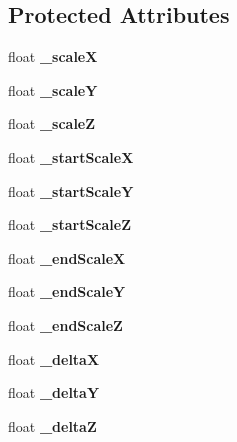 \subsection*{Protected Attributes}
\begin{DoxyCompactItemize}
\item 
\mbox{\label{classScaleTo_a9975e1bbe1566f02b118ff34f94ba5c6}} 
float {\bfseries \+\_\+scaleX}
\item 
\mbox{\label{classScaleTo_a14cf56324b48570a26e6d3262ee48d97}} 
float {\bfseries \+\_\+scaleY}
\item 
\mbox{\label{classScaleTo_af1853d4634f1783ca1b4d7de4adb78c1}} 
float {\bfseries \+\_\+scaleZ}
\item 
\mbox{\label{classScaleTo_a5e89593a799a7f4d03d2557bb407f7d9}} 
float {\bfseries \+\_\+start\+ScaleX}
\item 
\mbox{\label{classScaleTo_a611eb3f9a93c138b0f11a09cdbce6683}} 
float {\bfseries \+\_\+start\+ScaleY}
\item 
\mbox{\label{classScaleTo_a2f7da3e551f91d3d97506fbaa6b9d9c8}} 
float {\bfseries \+\_\+start\+ScaleZ}
\item 
\mbox{\label{classScaleTo_a9b4d150863834ad0e568095c7bf0aa02}} 
float {\bfseries \+\_\+end\+ScaleX}
\item 
\mbox{\label{classScaleTo_a250de07eb58913f19f1fc918f860f346}} 
float {\bfseries \+\_\+end\+ScaleY}
\item 
\mbox{\label{classScaleTo_a6c836b5959ccdc3e0593ff2d6905aebe}} 
float {\bfseries \+\_\+end\+ScaleZ}
\item 
\mbox{\label{classScaleTo_a75b80d0037c3687fec31177f1970e73d}} 
float {\bfseries \+\_\+deltaX}
\item 
\mbox{\label{classScaleTo_a7ba431e3f0ffd81bba9749bff2701b69}} 
float {\bfseries \+\_\+deltaY}
\item 
\mbox{\label{classScaleTo_aac731ceafdc7e89ad862e4cadb819912}} 
float {\bfseries \+\_\+deltaZ}
\end{DoxyCompactItemize}
